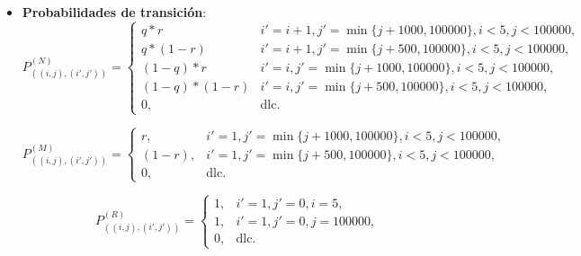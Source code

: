 \begin{enumerate}
\begin{itemize}
\begin{itemize}
	\end{itemize}

	\item[] \textbf{Probabilidades de transición}:
	\[P_{((i,j),(i',j'))}^{(N)} = 
		\begin{cases}
		q*r							&	i' = i + 1, j' = \min\{j + 1000, 100000\}, i < 5, j < 100000,\\
		q*(1-r)					&	i' = i + 1, j' = \min\{j + 500, 100000\},  i < 5, j < 100000, \\
		(1-q)*r					&	i' = i,     j' = \min\{j + 1000, 100000\}, i < 5, j < 100000,\\
		(1-q)*(1-r)			&	i' = i,     j' = \min\{j + 500, 100000\},  i < 5, j < 100000, \\
		0,							& \text{dlc}.  
		\end{cases} \]

	\[P_{((i,j),(i',j'))}^{(M)} = 
		\begin{cases}
		r,						&	i' = 1, j' = \min\{j + 1000, 100000\}, i < 5, j < 100000,\\
		(1-r),				&	i' = 1, j' = \min\{j + 500, 100000\}, i < 5, j < 100000,\\
		0,						& \text{dlc}.  
		\end{cases} \]
		

	\[P_{((i,j),(i',j'))}^{(R)} = 
		\begin{cases}
		1,		&	i' = 1, j' = 0, i = 5,\\
		1,		&	i' = 1, j' = 0, j = 100000,\\
		0,		& \text{dlc}.  
		\end{cases} \]
\end{itemize}
\end{enumerate}